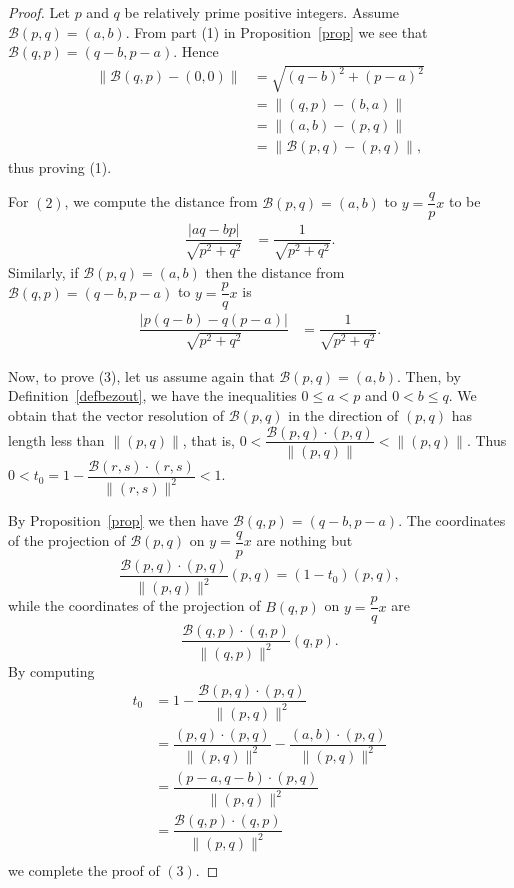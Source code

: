 \documentclass[12pt,english]{article}
\newcommand{\B}{\mathcal B}
\begin{document}
\begin{proof}
   
Let $p$ and $q$  be relatively prime positive integers. Assume $\B(p,q)=(a,b)$. From part (1) in Proposition~\ref{prop} we see that $\B(q,p)=(q-b,p-a)$. Hence
\begin{align*}
    \|\B(q,p) -(0,0)\| &= \sqrt{(q-b)^2+(p-a)^2}\\
                       &=\| (q,p)-(b,a)\|\\
                       &= \| (a,b)-(p,q)\|\\
                       &=\| \B(p,q)-(p,q)\|,
\end{align*}
thus proving (1).


For $(2)$, we compute the distance from $\B(p,q)=(a,b)$ to $y=\dfrac{q}{p}x$ to be 
\begin{align*}
    \dfrac{\left| aq-bp\right|}{\sqrt{p^2+q^2}} &= \dfrac{1}{\sqrt{p^2+q^2}}.
\end{align*}
 Similarly, if $\B(p,q)=(a,b)$ then the distance from $\B(q,p)=(q-b,p-a)$ to $y=\dfrac{p}{q}x$ is
\begin{align*}
    \dfrac{\left| p(q-b)-q(p-a)\right|}{\sqrt{p^2+q^2}} &= \dfrac{1}{\sqrt{p^2+q^2}}.
\end{align*}

Now, to prove (3), let us assume again that $\B(p,q)=(a,b)$.  Then, by Definition~\ref{defbezout}, we have the inequalities $0\leq a <p$ and $0<b\leq q$. %
We obtain that the vector resolution of $\B(p,q)$ in the direction of $(p,q)$ has length less than $\|(p,q)\|$, that is, $0< \dfrac{\B(p,q)\cdot (p,q)}{\|(p,q)\|}< \|(p,q)\|$. Thus $0< t_0 =1-\dfrac{\B(r,s)\cdot (r,s)}{\|(r,s)\|^2}< 1$. 

By Proposition~\ref{prop} we then have $\B(q,p)=(q-b,p-a)$. The coordinates of the projection of   $\B(p,q)$ on $y=\dfrac{q}{p}x$ are nothing but
\begin{equation*}
    \dfrac{\B(p,q)\cdot (p,q)}{\|(p,q)\|^2} (p,q)=(1-t_0)(p,q),
\end{equation*}
while the coordinates of the projection of $B(q,p)$ on $y=\dfrac{p}{q}x$ are
\begin{equation*}
    \dfrac{\B(q,p)\cdot (q,p)}{\|(q,p)\|^2} (q,p).
\end{equation*}
 By computing
 \begin{align*}
     t_0&=1-\dfrac{\B(p,q)\cdot (p,q)}{\|(p,q)\|^2} \\
     &=\dfrac{(p,q)\cdot (p,q)}{\|(p,q)\|^2}-\dfrac{(a,b)\cdot (p,q)}{\|(p,q)\|^2}\\
     &=\dfrac{(p-a,q-b)\cdot (p,q)}{\|(p,q)\|^2}\\
     &=\dfrac{\B(q,p)\cdot (q,p)}{\|(p,q)\|^2}\\
\end{align*}
 we complete the proof of $(3)$.
 

\end{proof}
\end{document}
